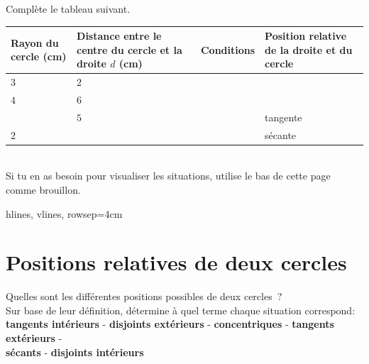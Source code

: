 \documentclass[../math2.tex]{subfiles}
\begin{document}
\newpage
\begin{exercise}
  Complète le tableau suivant. \\

  {\renewcommand{\arraystretch}{1.7}
  \begin{tabularx}{\linewidth}{|X|X|X|X|}
    \hline
    \textbf{Rayon du cercle (cm)} & \textbf{Distance entre le centre du cercle et la droite $d$ (cm)} & \textbf{Conditions} & \textbf{Position relative de la droite et du cercle} \\
    \hline
    $3$                           & $2$                                                               &                     &                                                      \\
    \hline
    $4$                           & $6$                                                               &                     &                                                      \\
    \hline
                                  & $5$                                                               &                     & tangente                                             \\
    \hline
    $2$                           &                                                                   &                     & sécante                                              \\
    \hline
  \end{tabularx}}\\

  Si tu en as besoin pour visualiser les situations, utilise le bas de cette page comme brouillon.
  \begin{tblr}{hlines, vlines, rowsep=4cm}
  \end{tblr}
\end{exercise}

\newpage
\section{Positions relatives de deux cercles}

Quelles sont les différentes positions possibles de deux cercles~? \\

Sur base de leur définition, détermine à quel terme chaque situation correspond:\\
\textbf{tangents intérieurs} - \textbf{disjoints extérieurs} - \textbf{concentriques} - \textbf{tangents extérieurs} -\\
\textbf{sécants} - \textbf{disjoints intérieurs}  \\
\end{document}
